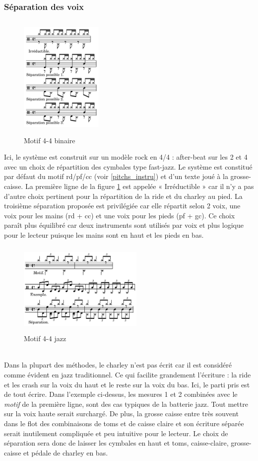 \subsubsection{Séparation des voix}
\label{sys_sep_voix}
\begin{figure}[h]
	\centering
	\includegraphics[height=60mm, width=40mm]{z_images/3_methodes/2_systemes/1_separation_4-4_binaire.png}
	\caption{Motif 4-4 binaire}
	\label{binaire}
\end{figure}
Ici, le système est construit sur un modèle rock en 4/4 : after-beat sur les 2 et 4 avec un choix de répartition des cymbales type fast-jazz. Le système est constitué par défaut du motif rd/pf/cc (voir \ref{pitchs_instru}) et d’un texte joué à la grosse-caisse. La première ligne de la figure \ref{binaire} est appelée « Irréductible » car il n’y a pas d’autre choix pertinent pour la répartition de la ride et du charley au pied. La troisième séparation proposée est privilégiée car elle répartit selon 2 voix, une voix pour les mains (rd + cc) et une voix pour les pieds (pf + gc). Ce choix paraît plus équilibré car deux instruments sont utilisés par voix et plus logique pour le lecteur puisque les mains sont en haut et les pieds en bas.
\begin{figure}[h]
	\centering
	\includegraphics[height=45mm, width=60mm]{z_images/3_methodes/2_systemes/2_separation_4-4_jazz.png}
	\caption{Motif 4-4 jazz}
	\label{jazz}
\end{figure}\\
Dans la plupart des méthodes, le charley n’est pas écrit car il est considéré comme évident en jazz traditionnel. Ce qui facilite grandement l’écriture : la ride et les crash sur la voix du haut et le reste sur la voix du bas. Ici, le parti pris est de tout écrire. Dans l’exemple ci-dessus, les mesures 1 et 2 combinées avec le \textit{motif} de la première ligne, sont des cas typiques de la batterie jazz. Tout mettre sur la voix haute serait surchargé. De plus, la grosse caisse entre très souvent dans le flot des combinaisons de toms et de caisse claire et son écriture séparée serait inutilement compliquée et peu intuitive pour le lecteur. Le choix de séparation sera donc de laisser les cymbales en haut et toms, caisse-claire, grosse-caisse et pédale de charley en bas.
